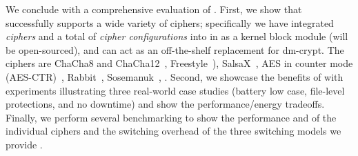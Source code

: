 We conclude with a comprehensive evaluation of \sys.
%
First, we show that \sys successfully supports a wide variety of ciphers;
specifically we have integrated {\em \numCiphers ciphers} and a total of {\em
\numConfigs cipher configurations} into \sys in \locTotal as a kernel block
module (will be open-sourced), and can act as an off-the-shelf replacement for
dm-crypt. The ciphers are ChaCha8 and ChaCha12~\cite{ChaCha20},
Freestyle~\cite{Freestyle}), SalsaX~\cite{SalsaX}, AES in counter mode
(AES-CTR)~\cite{AESCTR}, Rabbit~\cite{Rabbit}, Sosemanuk~\cite{Sosemanuk}, \xxx.
%
Second, we showcase the benefits of \sys with experiments illustrating three
real-world case studies (battery low case, file-level protections, and no
downtime) and show the performance/energy tradeoffs.
%
Finally, we perform several benchmarking to show the performance and \xxx of the
individual ciphers and the switching overhead of the three switching models we
provide .
